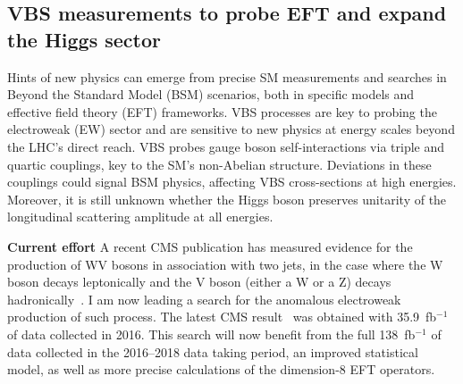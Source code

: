 {\begin{flushleft}
\section{VBS measurements to probe EFT and expand the Higgs sector}
\vskip 5pt

Hints of new physics can emerge from precise SM measurements and searches in Beyond the Standard Model (BSM) scenarios, both in specific models and effective field theory (EFT) frameworks. VBS processes are key to probing the electroweak (EW)  sector and are sensitive to new physics at energy scales beyond the LHC’s direct reach. VBS probes gauge boson self-interactions via triple and quartic couplings, key to the SM's non-Abelian structure. Deviations in these couplings could signal BSM physics, affecting VBS cross-sections at high energies. Moreover, it is still unknown whether the Higgs boson preserves unitarity of the longitudinal scattering amplitude at all energies.

\textbf{Current effort}
A recent CMS publication has measured evidence for the production of WV bosons in association with two jets, in the case where the W boson decays leptonically and the V boson (either a W or a Z) decays hadronically~\cite{[1]}. I am now leading a search for the anomalous electroweak production of such process. The latest CMS result~\cite{[2]} was obtained with 35.9~fb$^{-1}$ of data collected in 2016. This search will now benefit from the full 138~fb$^{-1}$ of data collected in the 2016--2018 data taking period, an improved statistical model, as well as more precise calculations of the dimension-8 EFT operators. %


\end{flushleft}}
